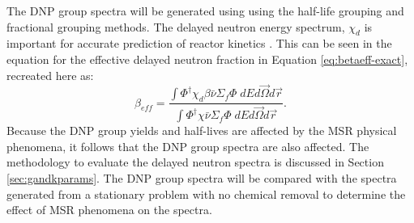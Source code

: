 The \gls{DNP} group spectra will be generated using using the half-life grouping and fractional grouping methods.
The delayed neutron energy spectrum, $\chi_d$ is important for accurate prediction of reactor kinetics \cite{das1993importance}.
This can be seen in the equation for the effective delayed neutron fraction in Equation \eqref{eq:betaeff-exact}, recreated here as:
\begin{equation}
    \beta_{eff} = \frac{\int \Phi^\dagger \chi_d \beta \bar{\nu} \Sigma_f \Phi \; dE d\vec{\Omega} d\vec{r}}{\int \Phi^\dagger \chi \bar{\nu} \Sigma_f \Phi \; dE d\vec{\Omega} d\vec{r}}.
    \nonumber
\end{equation}
Because the \gls{DNP} group yields and half-lives are affected by the \gls{MSR} physical phenomena, it follows that the \gls{DNP} group spectra are also affected.
The methodology to evaluate the delayed neutron spectra is discussed in Section \ref{sec:gandkparams}.
The \gls{DNP} group spectra will be compared with the spectra generated from a stationary problem with no chemical removal to determine the effect of \gls{MSR} phenomena on the spectra.